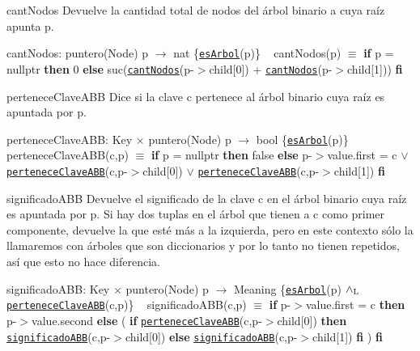 \begin{DoxyParagraph}{cant\+Nodos}
Devuelve la cantidad total de nodos del árbol binario a cuya raíz apunta p.

cant\+Nodos\+: puntero(\+Node) p $\to$ nat \{\href{axiomas.html#esArbol}{\tt es\+Arbol}(p)\} ~\newline
cant\+Nodos(p) $\equiv$ {\bfseries if} p = nullptr {\bfseries then} 0 {\bfseries else} suc(\href{axiomas.html#cantNodos}{\tt cant\+Nodos}(p-\/$>$child\mbox{[}0\mbox{]}) + \href{axiomas.html#cantNodos}{\tt cant\+Nodos}(p-\/$>$child\mbox{[}1\mbox{]})) {\bfseries fi} 


\end{DoxyParagraph}
\begin{DoxyParagraph}{pertenece\+Clave\+A\+BB}
Dice si la clave c pertenece al árbol binario cuya raíz es apuntada por p.

pertenece\+Clave\+A\+BB\+: Key $\times$ puntero(\+Node) p $\to$ bool \{\href{axiomas.html#esArbol}{\tt es\+Arbol}(p)\} ~\newline
pertenece\+Clave\+A\+B\+B(c,p) $\equiv$ {\bfseries if} p = nullptr {\bfseries then} false {\bfseries else} p-\/$>$value.\+first = c $\lor$ \href{axiomas.html#perteneceClaveABB}{\tt pertenece\+Clave\+A\+BB}(c,p-\/$>$child\mbox{[}0\mbox{]}) $\lor$ \href{axiomas.html#perteneceClaveABB}{\tt pertenece\+Clave\+A\+BB}(c,p-\/$>$child\mbox{[}1\mbox{]}) {\bfseries fi} 


\end{DoxyParagraph}
\begin{DoxyParagraph}{significado\+A\+BB}
Devuelve el significado de la clave c en el árbol binario cuya raíz es apuntada por p. Si hay dos tuplas en el árbol que tienen a c como primer componente, devuelve la que esté más a la izquierda, pero en este contexto sólo la llamaremos con árboles que son diccionarios y por lo tanto no tienen repetidos, así que esto no hace diferencia.

significado\+A\+BB\+: Key $\times$ puntero(\+Node) p $\to$ Meaning \{\href{axiomas.html#esArbol}{\tt es\+Arbol}(p) $\land_{\rm L}$ \href{axiomas.html#perteneceClaveABB}{\tt pertenece\+Clave\+A\+BB}(c,p)\} ~\newline
significado\+A\+B\+B(c,p) $\equiv$ {\bfseries if} p-\/$>$value.\+first = c {\bfseries then} p-\/$>$value.\+second {\bfseries else} ( {\bfseries if} \href{axiomas.html#perteneceClaveABB}{\tt pertenece\+Clave\+A\+BB}(c,p-\/$>$child\mbox{[}0\mbox{]}) {\bfseries then} \href{axiomas.html#significadoABB}{\tt significado\+A\+BB}(c,p-\/$>$child\mbox{[}0\mbox{]}) {\bfseries else} \href{axiomas.html#significadoABB}{\tt significado\+A\+BB}(c,p-\/$>$child\mbox{[}1\mbox{]}) {\bfseries fi} ) {\bfseries fi} 


\end{DoxyParagraph}
